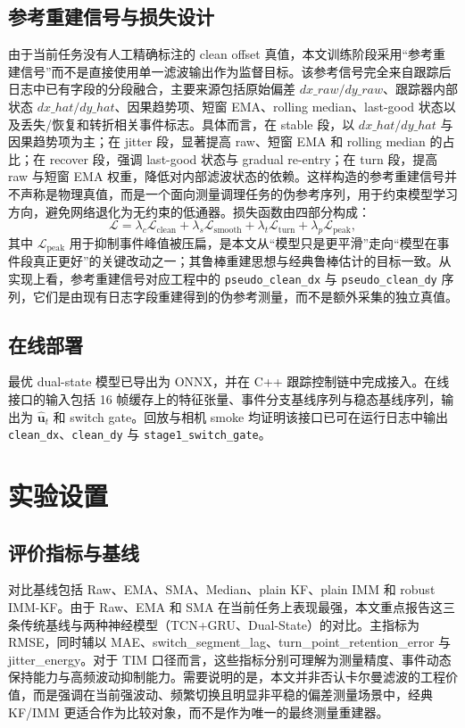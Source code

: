﻿\documentclass[lettersize,journal]{IEEEtran}
\begin{document}
\subsection{参考重建信号与损失设计}
由于当前任务没有人工精确标注的 clean offset 真值，本文训练阶段采用“参考重建信号”而不是直接使用单一滤波输出作为监督目标。该参考信号完全来自跟踪后日志中已有字段的分段融合，主要来源包括原始偏差 $dx\_raw/dy\_raw$、跟踪器内部状态 $dx\_hat/dy\_hat$、因果趋势项、短窗 EMA、rolling median、last-good 状态以及丢失/恢复和转折相关事件标志。具体而言，在 stable 段，以 $dx\_hat/dy\_hat$ 与因果趋势项为主；在 jitter 段，显著提高 raw、短窗 EMA 和 rolling median 的占比；在 recover 段，强调 last-good 状态与 gradual re-entry；在 turn 段，提高 raw 与短窗 EMA 权重，降低对内部滤波状态的依赖。这样构造的参考重建信号并不声称是物理真值，而是一个面向测量调理任务的伪参考序列，用于约束模型学习方向，避免网络退化为无约束的低通器。损失函数由四部分构成：
\begin{equation}
\mathcal{L}=\lambda_c\mathcal{L}_{\mathrm{clean}}+\lambda_s\mathcal{L}_{\mathrm{smooth}}+\lambda_t\mathcal{L}_{\mathrm{turn}}+\lambda_p\mathcal{L}_{\mathrm{peak}},
\end{equation}
其中 $\mathcal{L}_{\mathrm{peak}}$ 用于抑制事件峰值被压扁，是本文从“模型只是更平滑”走向“模型在事件段真正更好”的关键改动之一；其鲁棒重建思想与经典鲁棒估计的目标一致\cite{huber1964robust}。从实现上看，参考重建信号对应工程中的 \texttt{pseudo\_clean\_dx} 与 \texttt{pseudo\_clean\_dy} 序列，它们是由现有日志字段重建得到的伪参考测量，而不是额外采集的独立真值。

\subsection{在线部署}
最优 dual-state 模型已导出为 ONNX，并在 C++ 跟踪控制链中完成接入。在线接口的输入包括 16 帧缓存上的特征张量、事件分支基线序列与稳态基线序列，输出为 $\hat{\mathbf{u}}_t$ 和 switch gate。回放与相机 smoke 均证明该接口已可在运行日志中输出 \texttt{clean\_dx}、\texttt{clean\_dy} 与 \texttt{stage1\_switch\_gate}。

\section{实验设置}
\subsection{评价指标与基线}
对比基线包括 Raw、EMA、SMA、Median、plain KF、plain IMM 和 robust IMM-KF。由于 Raw、EMA 和 SMA 在当前任务上表现最强，本文重点报告这三条传统基线与两种神经模型（TCN+GRU、Dual-State）的对比。主指标为 RMSE，同时辅以 MAE、switch\_segment\_lag、turn\_point\_retention\_error 与 jitter\_energy。对于 TIM 口径而言，这些指标分别可理解为测量精度、事件动态保持能力与高频波动抑制能力。需要说明的是，本文并非否认卡尔曼滤波的工程价值，而是强调在当前强波动、频繁切换且明显非平稳的偏差测量场景中，经典 KF/IMM 更适合作为比较对象，而不是作为唯一的最终测量重建器。
\end{document}
